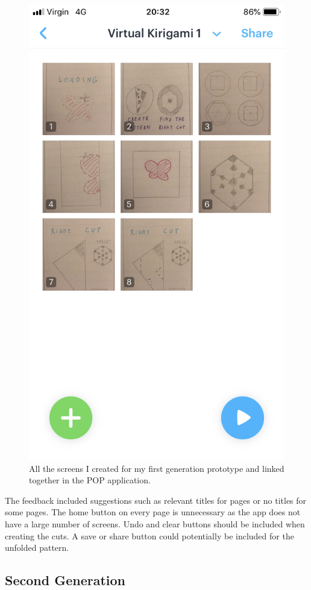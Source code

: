 \documentclass[11pt]{article}
\begin{document}
\begin{figure}[!ht]
\begin{minipage}{0.45\textwidth}
                            \includegraphics[width=0.7\linewidth]{Images/popMultiple.PNG}
                            \caption{All the screens I created for my first generation prototype and linked together in the POP application.}
                            \label{fig:popMultiple}
                        \end{minipage}
                    \end{figure}
                    
                The feedback included suggestions such as relevant titles for pages or no titles for some pages. The home button on every page is unnecessary as the app does not have a large number of screens. Undo and clear buttons should be included when creating the cuts. A save or share button could potentially be included for the unfolded pattern.
                 
            
    \subsection{Second Generation}
\end{document}
